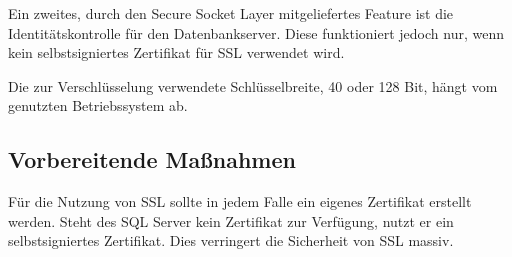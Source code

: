       Ein zweites, durch den Secure Socket Layer mitgeliefertes Feature ist die
      Identitätskontrolle für den Datenbankserver. Diese funktioniert jedoch
      nur, wenn kein selbstsigniertes Zertifikat für SSL verwendet wird.
      \begin{merke}
        Die zur Verschlüsselung verwendete Schlüsselbreite, 40 oder 128 Bit,
        hängt vom genutzten Betriebssystem ab.
      \end{merke}
      \subsection{Vorbereitende Maßnahmen}
        \begin{merke}
          Für die Nutzung von SSL sollte in jedem Falle ein eigenes Zertifikat
          erstellt werden. Steht des SQL Server kein Zertifikat zur Verfügung,
          nutzt er ein selbstsigniertes Zertifikat. Dies verringert die
          Sicherheit von SSL massiv.
        \end{merke}
